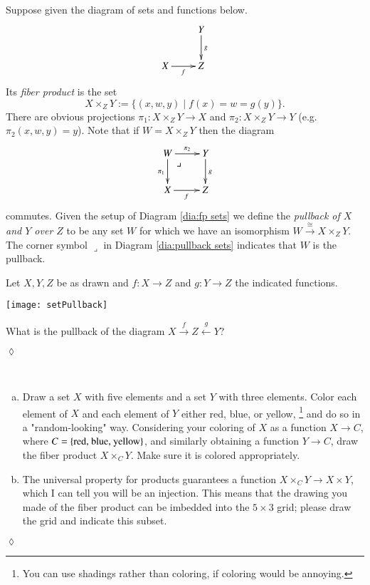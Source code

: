 \documentclass{book}
\makeatletter
\def\tn{\textnormal}
\def\to{\rightarrow}
\def\taking{\colon}
\def\iso{\cong}
\def\|{{\;|\;}}
\def\ullimit{\ar@{}[rd]|(.3)*+{\lrcorner}}
\newcommand{\To}[1]{\xrightarrow{#1}}
\newcommand{\Too}[1]{\xrightarrow{\ \ #1\ \ }}
\newcommand{\Fromm}[1]{\xleftarrow{\ \ #1\ \ }}
\theoremstyle{theoremENG}
\theoremstyle{lemmaENG}
\theoremstyle{propositionENG}
\theoremstyle{corollaryENG}
\theoremstyle{factENG}
\theoremstyle{remarkENG}
\theoremstyle{exampleENG}
\theoremstyle{warningENG}
\theoremstyle{questionENG}
\theoremstyle{guessENG}
\theoremstyle{answerENG}
\theoremstyle{constructionENG}
\theoremstyle{rulesENG}
\theoremstyle{excENG}
\newtheorem{excENG}[subsubsection]{\begin{english}Exercise\end{english}}
\theoremstyle{appENG}
\theoremstyle{definitionENG}
\newtheorem{definitionENG}[subsubsection]{\begin{english}Definition\end{english}}
\theoremstyle{notationENG}
\theoremstyle{conjectureENG}
\theoremstyle{postulateENG}
\newenvironment{exerciseENG}{\begin{excENG}}{\hspace*{\fill}$\lozenge$\end{excENG}}
\theoremstyle{theoremRUS}
\theoremstyle{lemmaRUS}
\theoremstyle{propositionRUS}
\theoremstyle{corollaryRUS}
\theoremstyle{factRUS}
\theoremstyle{remarkRUS}
\theoremstyle{exampleRUS}
\theoremstyle{warningRUS}
\theoremstyle{questionRUS}
\theoremstyle{guessRUS}
\theoremstyle{answerRUS}
\theoremstyle{constructionRUS}
\theoremstyle{rulesRUS}
\theoremstyle{excRUS}
\theoremstyle{appRUS}
\theoremstyle{definitionRUS}
\theoremstyle{notationRUS}
\theoremstyle{conjectureRUS}
\theoremstyle{postulateRUS}
\def\sexc{\begin{enumerate}[a.)]\setlength{\itemsep}{.1cm}\setlength{\parskip}{.1cm}\item}
\def\next{\item}
\def\endsexc{\end{enumerate}}
\makeatother
\begin{document}
\begin{english}
\begin{definitionENG}[Pullback]\label{def:pullback}

Suppose given the diagram of sets and functions below.
\begin{align}\label{dia:fp sets}
\xymatrix{&Y\ar[d]^g\\
X\ar[r]_f&Z}
\end{align}
Its {\em fiber product} is the set 
$$X\times_ZY:=\{(x,w,y)\|f(x)=w=g(y)\}.$$ There are obvious projections $\pi_1\taking X\times_ZY\to X$ and $\pi_2\taking X\times_ZY\to Y$ (e.g. $\pi_2(x,w,y)=y$). Note that if $W=X\times_ZY$ then the diagram 
\begin{align}\label{dia:pullback sets}
\xymatrix{W\ullimit\ar[r]^-{\pi_2}\ar[d]_{\pi_1}&Y\ar[d]^g\\
X\ar[r]_f&Z}
\end{align}
commutes. Given the setup of Diagram \ref{dia:fp sets} we define the {\em pullback of $X$ and $Y$ over $Z$} to be any set $W$ for which we have an isomorphism $W\To{\iso}X\times_ZY$. The corner symbol $\lrcorner$ in Diagram \ref{dia:pullback sets} indicates that $W$ is the pullback.

\begin{russian} \end{russian}

\end{definitionENG}

\begin{exerciseENG}

Let $X,Y,Z$ be as drawn and $f\taking X\to Z$ and $g\taking Y\to Z$ the indicated functions. 
\begin{center}
\texttt{[image: setPullback]}
\end{center}
What is the pullback of the diagram $X\Too{f}Z\Fromm{g}Y$?

\begin{russian} \end{russian}

\end{exerciseENG}

\begin{exerciseENG}~

\sexc Draw a set $X$ with five elements and a set $Y$ with three elements. Color each element of $X$ and each element of $Y$ either red, blue, or yellow,
\footnote{You can use shadings rather than coloring, if coloring would be annoying.}
and do so in a "random-looking" way. Considering your coloring of $X$ as a function $X\to C$, where $C=\{\tn{red, blue, yellow}\}$, and similarly obtaining a function $Y\to C$, draw the fiber product $X\times_CY$. Make sure it is colored appropriately.
\next The universal property for products guarantees a function $X\times_CY\to X\times Y$, which I can tell you will be an injection. This means that the drawing you made of the fiber product can be imbedded into the $5\times 3$ grid; please draw the grid and indicate this subset.
\endsexc


\end{exerciseENG}
\end{english}
\end{document}
